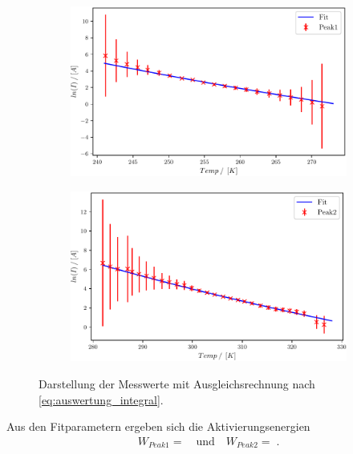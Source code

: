 \begin{figure}
\centering
\begin{subfigure}{0.5\textwidth}
	\centering
	\includegraphics[width=1\textwidth]{build/2_Temp_current_peak_log_3.pdf}
	\caption{}
	\label{fig:Auswertung_22}
\end{subfigure}%
\begin{subfigure}{0.5\textwidth}
	\centering
	\includegraphics[width=1\textwidth]{build/2_Temp_current_peak2_log_3.pdf}
	\caption{}
	\label{fig:Auswertung_23}
\end{subfigure}
\caption{Darstellung der Messwerte mit Ausgleichsrechnung nach \ref{eq:auswertung_integral}.}
\label{fig:Auswertung_22_23}
\end{figure}


Aus den Fitparametern ergeben sich die Aktivierungsenergien 
\begin{align}
	W_{Peak1} =   \quad \text{und} \quad W_{Peak2} = \;.
\end{align}


